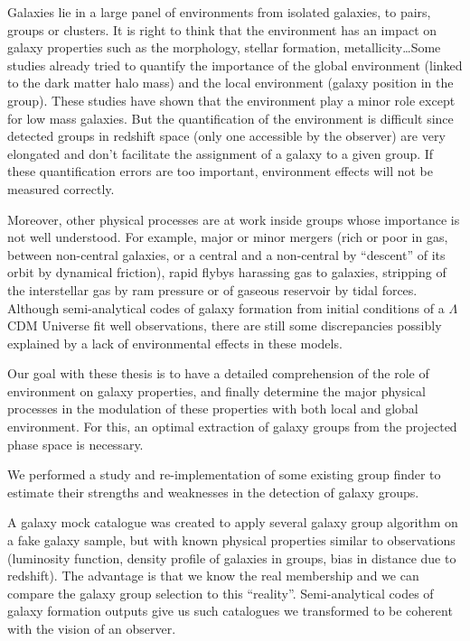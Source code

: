 \cleardoublepage%
%
\begin{bartabstract}
    Galaxies lie in a large panel of environments from isolated galaxies, to
    pairs, groups or clusters. It is right to think that the environment has an
    impact on galaxy properties such as the morphology, stellar formation,
    metallicity\ldots Some studies already tried to quantify the importance of
    the global environment (linked to the dark matter halo mass) and the local
    environment (galaxy position in the group). These studies have shown that
    the environment play a minor role except for low mass galaxies. But the
    quantification of the environment is difficult since detected groups in
    redshift space (only one accessible by the observer) are very elongated and
    don't facilitate the assignment of a galaxy to a given group. If these
    quantification errors are too important, environment effects will not be
    measured correctly.

    Moreover, other physical processes are at work inside groups whose
    importance is not well understood. For example, major or minor mergers
    (rich or poor in gas, between non-central galaxies, or a central and a
    non-central by ``descent'' of its orbit by dynamical friction), rapid
    flybys harassing gas to galaxies, stripping of the interstellar gas by ram
    pressure or of gaseous reservoir by tidal forces. Although semi-analytical
    codes of galaxy formation from initial conditions of a $\Lambda$CDM
    Universe fit well observations, there are still some discrepancies possibly
    explained by a lack of environmental effects in these models.

    Our goal with these thesis is to have a detailed comprehension of the role
    of environment on galaxy properties, and finally determine the major
    physical processes in the modulation of these properties with both local
    and global environment. For this, an optimal extraction of galaxy groups
    from the projected phase space is necessary.

    We performed a study and re-implementation of some existing group finder to
    estimate their strengths and weaknesses in the detection of galaxy groups.

    A galaxy mock catalogue was created to apply several galaxy group algorithm
    on a fake galaxy sample, but with known physical properties similar to
    observations (luminosity function, density profile of galaxies in groups,
    bias in distance due to redshift). The advantage is that we know the real
    membership and we can compare the galaxy group selection to this
    ``reality''. Semi-analytical codes of galaxy formation outputs give us such
    catalogues we transformed to be coherent with the vision of an observer.


\end{bartabstract}
